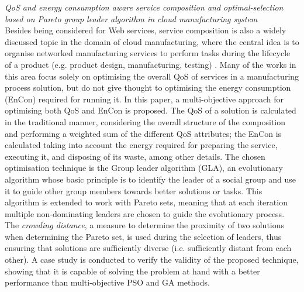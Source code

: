 \textit{QoS and energy consumption aware service composition and optimal-selection based on Pareto group leader algorithm in cloud manufacturing system \cite{xiang2014qos}}\\
Besides being considered for Web services, service composition is also a widely discussed topic in the domain of cloud manufacturing, where the central idea is to organise networked manufacturing services to perform tasks during the lifecycle of a product (e.g. product design, manufacturing, testing) \cite{zhang2014cloud}. Many of the works in this area focus solely on optimising the overall QoS of services in a manufacturing process solution, but do not give thought to optimising the energy consumption (EnCon) required for running it. In this paper, a multi-objective approach for optimising both QoS and EnCon is proposed. The QoS of a solution is calculated in the traditional manner, considering the overall structure of the composition and performing a weighted sum of the different QoS attributes; the EnCon is calculated taking into account the energy required for preparing the service, executing it, and disposing of its waste, among other details. The chosen optimisation technique is the Group leader algorithm (GLA), an evolutionary algorithm whose basic principle is to identify the leader of a social group and use it to guide other group members towards better solutions or tasks. This algorithm is extended to work with Pareto sets, meaning that at each iteration multiple non-dominating leaders are chosen to guide the evolutionary process. The \textit{crowding distance}, a measure to determine the proximity of two solutions when determining the Pareto set, is used during the selection of leaders, thus ensuring that solutions are sufficiently diverse (i.e. sufficiently distant from each other). A case study is conducted to verify the validity of the proposed technique, showing that it is capable of solving the problem at hand with a better performance than multi-objective PSO and GA methods.


